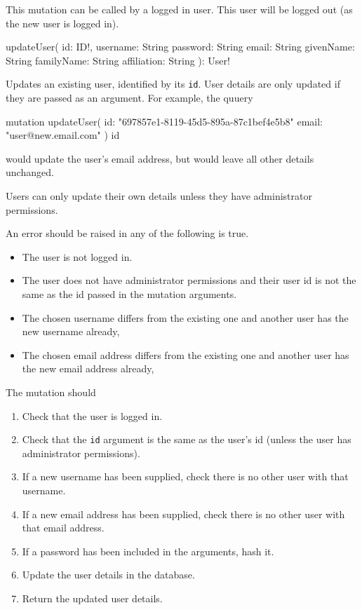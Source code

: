 \begin{note}
This mutation can be called by a logged in user. This user will be logged out (as the new user is logged in).
\end{note}


\begin{code}
updateUser(
  id: ID!,
  username: String
  password: String
  email: String
  givenName: String
  familyName: String
  affiliation: String
): User!
\end{code}

Updates an existing user, identified by its \verb|id|. User details are only updated if they are passed as an argument. For example, the quuery

\begin{code}
mutation {
  updateUser(
    id: "697857e1-8119-45d5-895a-87c1bef4e5b8"
    email: "user@new.email.com"
  ) {
    id
  }
}
\end{code}

would update the user's email address, but would leave all other details unchanged.

\restrictions

Users can only update their own details unless they have administrator permissions.

\errors

An error should be raised in any of the following is true.

\begin{itemize}
    \item The user is not logged in.
    \item The user does not have administrator permissions and their user id is not the same as the id passed in the mutation arguments.
    \item The chosen username differs from the existing one and another user has the new username already,
    \item The chosen email address differs from the existing one and another user has the new email address already,
\end{itemize}

\functionality

The mutation should

\begin{enumerate}
    \item Check that the user is logged in.
    \item Check that the \verb|id| argument is the same as the user's id (unless the user has administrator permissions).
    \item If a new username has been supplied, check there is no other user with that username.
    \item If a new email address has been supplied, check there is no other user with that email address.
    \item If a password has been included in the arguments, hash it.
    \item Update the user details in the database.
    \item Return the updated user details.
\end{enumerate}

